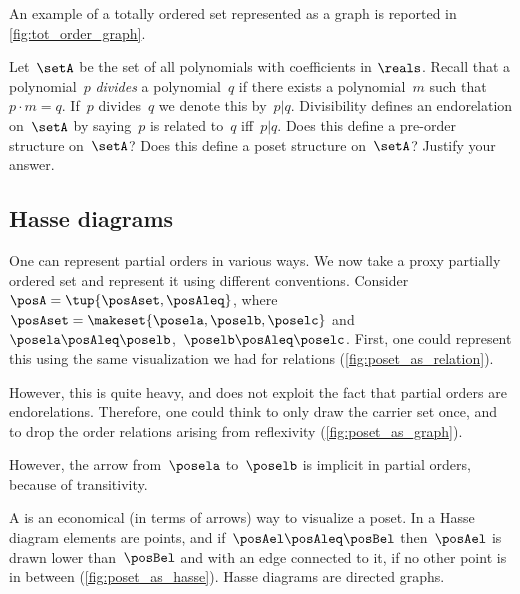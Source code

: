 \begin{marginfigure}
    \centering
    \caption{}
    \label{fig:tot_order_graph}
\end{marginfigure}

An example of a totally ordered set represented as a graph is reported in \cref{fig:tot_order_graph}.
\vfill
\begin{gradedexercise}
    \label{ex:PolynomialDivisibility}
    Let~$\setA$ be the set of all polynomials with coefficients in $\reals$.
    Recall that a polynomial~$p$ \emph{divides} a polynomial~$q$ if there exists a polynomial~$m$ such that~$p \cdot m = q$.
    If~$p$ divides~$q$ we denote this by~$p \vert q$.
    Divisibility defines an endorelation on~$\setA$ by saying~$p$ is related to~$q$ iff~$p \vert q$.
    Does this define a pre-order structure on~$\setA$?
    Does this define a poset structure on~$\setA$?
    Justify your answer.
\end{gradedexercise}

\vfill
\clearpage

\subsection{Hasse diagrams}
One can represent partial orders in various ways.
We now take a proxy partially ordered set and represent it using different conventions.
Consider~$\posA=\tup{\posAset,\posAleq}$, where~$\posAset=\makeset{\posela,\poselb,\poselc}$ and~$\posela\posAleq \poselb$,~$\poselb\posAleq \poselc$.
First, one could represent this using the same visualization we had for relations (\cref{fig:poset_as_relation}).

However, this is quite heavy, and does not exploit the fact that partial orders are endorelations.
Therefore, one could think to only draw the carrier set once, and to drop the order relations arising from reflexivity (\cref{fig:poset_as_graph}).

However, the arrow from~$\posela$ to~$\poselb$ is implicit in partial orders, because of transitivity.

A \emph{} is an economical (in terms of arrows) way to visualize a poset.
In a Hasse diagram elements are points, and if~$\posAel \posAleq \posBel$ then~$\posAel$ is drawn lower than~$\posBel$ and with an edge connected to it, if no other point is in between (\cref{fig:poset_as_hasse}).
Hasse diagrams are directed graphs.


